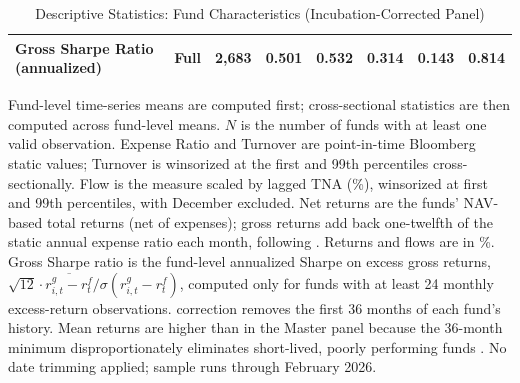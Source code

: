 \begin{table}[!htbp]
{\begin{tabular}[t]{llrrrrrr}
\multirow{-3}{*}{\raggedright\arraybackslash Gross Sharpe Ratio (annualized)} & Full & 2,683 & 0.501 & 0.532 & 0.314 & 0.143 & 0.814\\
\bottomrule
\end{tabular}%
}\sbefit
\setlength{\tabletempwidth}{\wd\tabletempbox}
\ifdim\tabletempwidth>\linewidth\setlength{\tabletempwidth}{\linewidth}\fi
\begin{minipage}{\tabletempwidth}
\captionsetup{width=\linewidth}
\caption{\label{tab:desc_stats}Descriptive Statistics: Fund Characteristics (Incubation-Corrected Panel)}
\ifdim\wd\tabletempbox>\linewidth
  \resizebox{\linewidth}{!}{\usebox{\tabletempbox}}
\else
  \usebox{\tabletempbox}
\fi
\par\medskip
\begin{singlespace}\tablefont\noindent
Fund-level time-series means are computed first; cross-sectional statistics are then computed across fund-level means. $N$ is the number of funds with at least one valid observation. Expense Ratio and Turnover are point-in-time Bloomberg static values; Turnover is winsorized at the first and 99th percentiles cross-sectionally. Flow is the \textcite{SirriTufano1998} measure scaled by lagged TNA (\%), winsorized at first and 99th percentiles, with December excluded. Net returns are the funds' NAV-based total returns (net of expenses); gross returns add back one-twelfth of the static annual expense ratio each month, following \textcite{FamaFrench2010}. Returns and flows are in \%. Gross Sharpe ratio is the fund-level annualized Sharpe on excess gross returns, $\sqrt{12}\cdot\overline{r^{g}_{i,t}-r^{f}_{t}}/\sigma(r^{g}_{i,t}-r^{f}_{t})$, computed only for funds with at least 24 monthly excess-return observations. \textcite{Evans2010} correction removes the first 36 months of each fund's history. Mean returns are higher than in the Master panel because the 36-month minimum disproportionately eliminates short-lived, poorly performing funds \parencite{Evans2010}. No date trimming applied; sample runs through February 2026.
\end{singlespace}
\end{minipage}
\end{table}

